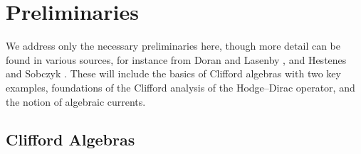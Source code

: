 \documentclass{article}
\begin{document}


\section{Preliminaries}
\label{sec:preliminaries}
We address only the necessary preliminaries here, though more detail can be found in various sources, for instance from Doran and Lasenby \cite{doran_geometric_2003}, and Hestenes and Sobczyk \cite{hestenes_clifford_1984}. These will include the basics of Clifford algebras with two key examples, foundations of the Clifford analysis of the Hodge--Dirac operator, and the notion of algebraic currents.

\subsection{Clifford Algebras}
\label{subsec:clifford_algebras}
\end{document}
